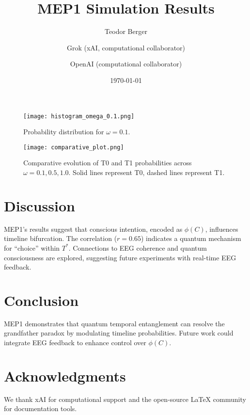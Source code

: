 \begin{figure}[h]
\centering
\texttt{[image: histogram\_omega\_0.1.png]}
\caption{Probability distribution for $\omega = 0.1$.}
\label{fig:hist_0.1}
\end{figure}
\begin{figure}[h]
\centering
\texttt{[image: comparative\_plot.png]}
\caption{Comparative evolution of T0 and T1 probabilities across $\omega = 0.1, 0.5, 1.0$. Solid lines represent T0, dashed lines represent T1.}
\label{fig:comparative}
\end{figure}

\section{Discussion}
MEP1’s results suggest that conscious intention, encoded as $\phi(C)$, influences timeline bifurcation. The correlation ($r = 0.65$) indicates a quantum mechanism for ``choice'' within $T^*$. Connections to EEG coherence \citep{lutz2004} and quantum consciousness \citep{penrose1994} are explored, suggesting future experiments with real-time EEG feedback.

\section{Conclusion}
MEP1 demonstrates that quantum temporal entanglement can resolve the grandfather paradox by modulating timeline probabilities. Future work could integrate EEG feedback to enhance control over $\phi(C)$.

\section{Acknowledgments}
We thank xAI for computational support and the open-source LaTeX community for documentation tools.





\documentclass[a4paper,12pt]{article}
\usepackage[utf8]{inputenc}
\usepackage{amsmath, amssymb, amsfonts}
\usepackage{graphicx}
\usepackage{geometry}
\geometry{a4paper, margin=1in}

\title{MEP1 Simulation Results}
\author{Teodor Berger \and Grok (xAI, computational collaborator) \and OpenAI (computational collaborator)}
\date{\today}



\maketitle

